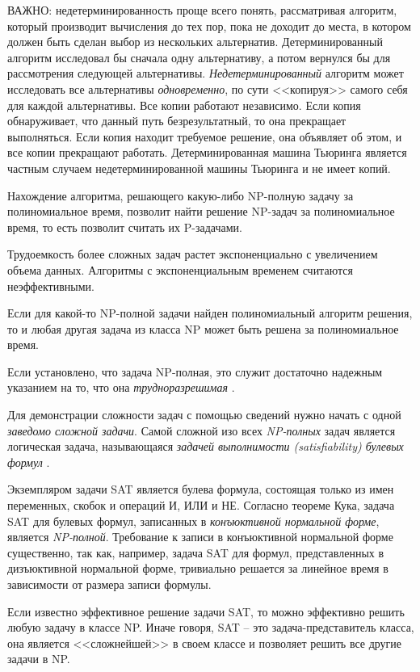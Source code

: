 \documentclass[%
	11pt,
	a4paper,
	utf8,
		]{article}
\begin{document}
ВАЖНО: недетерминированность проще всего понять, рассматривая алгоритм, который производит вычисления до тех пор, пока не доходит до места, в котором должен быть сделан выбор из нескольких альтернатив. Детерминированный алгоритм исследовал бы сначала одну альтернативу, а потом вернулся бы для рассмотрения следующей альтернативы. \emph{Недетерминированный} алгоритм может исследовать все альтернативы \emph{одновременно}, по сути <<копируя>> самого себя для каждой альтернативы. Все копии работают независимо. Если копия обнаруживает, что данный путь безрезультатный, то она прекращает выполняться. Если копия находит требуемое решение, она объявляет об этом, и все копии прекращают работать. Детерминированная машина Тьюринга является частным случаем недетерминированной машины Тьюринга и не имеет копий.

Нахождение алгоритма, решающего какую-либо NP-полную задачу за полиномиальное время, позволит найти решение NP-задач за полиномиальное время, то есть позволит считать их P-задачами.

Трудоемкость более сложных задач растет экспоненциально с увеличением объема данных. Алгоритмы с экспоненциальным временем считаются неэффективными. 

Если для какой-то NP-полной задачи найден полиномиальный алгоритм решения, то и любая другая задача из класса NP может быть решена за полиномиальное время.

Если установлено, что задача NP-полная, это служит достаточно надежным указанием на то, что она \emph{трудноразрешимая} \cite[1088]{cormen-algo:2013}.

Для демонстрации сложности задач с помощью сведений нужно начать с одной \emph{заведомо сложной задачи}. {\color{red}Самой сложной изо всех \emph{NP-полных} задач} является логическая задача, называющаяся \emph{задачей выполнимости ({\rmfamily satisfiability}) булевых формул} \cite[351]{skiena-algo:2011}.

Экземпляром задачи SAT является булева формула, состоящая только из имен переменных, скобок и операций И, ИЛИ и НЕ. Согласно теореме Кука, задача SAT для булевых формул, записанных в \emph{конъюктивной нормальной форме}, является \emph{NP-полной}. Требование к записи в конъюктивной нормальной форме существенно, так как, например, задача SAT для формул, представленных в дизъюктивной нормальной форме, тривиально решается за линейное время в зависимости от размера записи формулы.

Если известно эффективное решение задачи SAT, то можно эффективно решить любую задачу в классе NP. Иначе говоря, SAT -- это задача-представитель класса, она является <<сложнейшей>> в своем классе и позволяет решить все другие задачи в NP.
\end{document}
